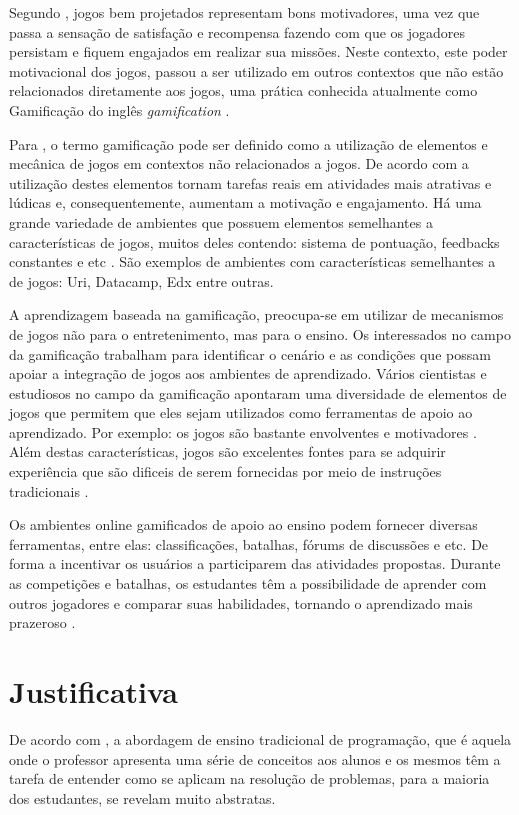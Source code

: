 Segundo , jogos bem projetados representam bons motivadores, uma vez que passa a sensação de satisfação
e recompensa fazendo com que os jogadores persistam e fiquem engajados em realizar sua missões. Neste contexto, este poder
motivacional dos jogos, passou a ser utilizado em outros contextos que não estão relacionados diretamente aos jogos, uma prática 
conhecida atualmente como Gamificação do inglês \textit{gamification} {\itshape}.

Para , o termo gamificação pode ser definido como a utilização de elementos e mecânica de 
jogos em contextos não relacionados a jogos. De acordo com  a utilização destes elementos tornam tarefas reais em atividades
mais atrativas e lúdicas e, consequentemente, aumentam a motivação e engajamento. Há uma grande variedade de ambientes que possuem 
elementos semelhantes a características de jogos, muitos deles contendo: sistema de pontuação, feedbacks constantes e 
etc \cite{6624228}. São exemplos de ambientes com características semelhantes a de jogos: Uri, Datacamp, Edx entre outras.

A aprendizagem baseada na gamificação, preocupa-se em utilizar de mecanismos de jogos não para o entretenimento,
mas para o ensino. Os interessados no campo da gamificação trabalham para identificar o cenário e as condições 
que possam apoiar a integração de jogos aos ambientes de aprendizado. Vários cientistas e estudiosos no campo
da gamificação apontaram uma diversidade de elementos de jogos que permitem que eles sejam utilizados como
ferramentas de apoio ao aprendizado. Por exemplo: os jogos são bastante envolventes \cite{Dickey2005} e motivadores \cite{Prensky:2003:DGL:950566.950596}. Além destas características,
jogos são excelentes fontes para se adquirir experiência que são dificeis de serem fornecidas por meio de instruções tradicionais \cite{Arena2014}.

Os ambientes online gamificados de apoio ao ensino podem fornecer diversas ferramentas, entre elas: classificações, batalhas, fórums de discussões e etc.
De forma a incentivar os usuários a participarem das atividades propostas. 
Durante as competições e batalhas, os estudantes têm a possibilidade de aprender com outros jogadores e comparar suas habilidades, tornando o aprendizado mais
prazeroso \cite{LearningProgramming}. 

\section{Justificativa}
De acordo com , a abordagem de ensino tradicional de programação, que é aquela onde o professor apresenta
uma série de conceitos aos alunos e os mesmos têm a tarefa de entender como se aplicam na resolução de problemas,
para a maioria dos estudantes, se revelam muito abstratas.

